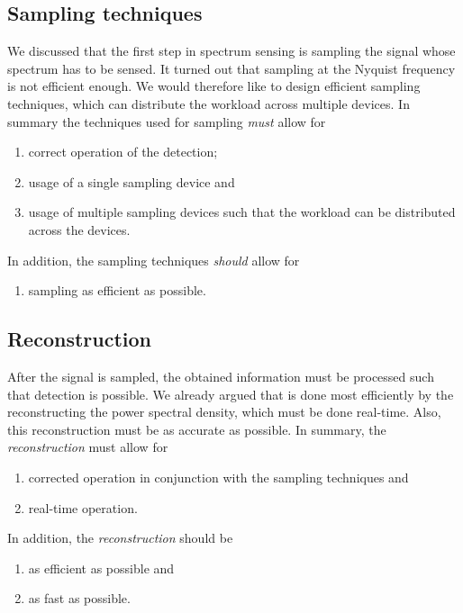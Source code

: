 \documentclass[a4paper, openany, oneside]{memoir}
\begin{document}
\subsection{Sampling techniques}
We discussed that the first step in spectrum sensing is sampling the signal whose spectrum has to be sensed. It turned out that sampling at the Nyquist frequency is not efficient enough. We would therefore like to design efficient sampling techniques, which can distribute the workload across multiple devices. In summary the techniques used for sampling \emph{must} allow for
\begin{enumerate}
    \item correct operation of the detection;
    \item usage of a single sampling device and
    \item usage of multiple sampling devices such that the workload can be distributed across the devices.
\end{enumerate}
In addition, the sampling techniques \emph{should} allow for
\begin{enumerate}
    \item sampling as efficient as possible.
\end{enumerate}

\subsection{Reconstruction}
After the signal is sampled, the obtained information must be processed such that detection is possible. We already argued that is done most efficiently by the reconstructing the power spectral density, which must be done real-time. Also, this reconstruction must be as accurate as possible. In summary, the \textit{reconstruction} must allow for
\begin{enumerate}
    \item corrected operation in conjunction with the sampling techniques and
    \item real-time operation.
\end{enumerate}
In addition, the \textit{reconstruction} should be
\begin{enumerate}
    \item as efficient as possible and
    \item as fast as possible.
\end{enumerate}



\end{document}
